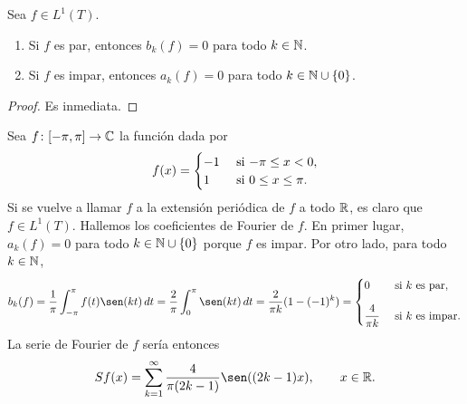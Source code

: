 \documentclass[a4paper, 11pt, oneside]{report}
\begin{document}
\begin{proposition}
  Sea $f \in L^1(T)$.
  \begin{enumerate}
    \item Si $f$ es par, entonces $b_k(f)= 0$ para todo $k \in \mathbb N$.
    \item Si $f$ es impar, entonces $a_k(f)=0$ para todo $k \in \mathbb N \cup \{0\}$.
  \end{enumerate}
\end{proposition}

\begin{proof}
  Es inmediata.
\end{proof}

\begin{example}
  Sea $f \colon [-\pi, \pi] \to \mathbb C$ la función dada por
  \[f(x) = \begin{cases}
    -1 & $ si $ -\pi \leq x < 0, \\
    1 & $ si $ 0 \leq x \leq \pi.
  \end{cases}\]
  Si se vuelve a llamar $f$ a la extensión periódica de $f$ a todo $\mathbb R$, es claro que $f \in L^1(T)$. Hallemos los coeficientes de Fourier de $f$. En primer lugar, $a_k(f)=0$ para todo $k \in \mathbb N \cup \{0\}$ porque $f$ es impar. Por otro lado, para todo $k \in \mathbb N$,
    \[
    \begin{aligned}[t]
      b_k(f)=\frac{1}{\pi}\int_{-\pi}^\pi f(t)\sen(kt) \, dt = \frac{2}{\pi}\int_{0}^\pi \sen(kt)\, dt = \frac{2}{\pi k}(1-(-1)^k) = \begin{cases}
        0 & $ si $ k $ es par$, \\[10pt]
        \displaystyle \frac{4}{\pi k} & $ si $ k $ es impar$.
      \end{cases}
    \end{aligned}
    \]
  La serie de Fourier de $f$ sería entonces
  \[Sf(x) = \sum_{k=1}^\infty \frac{4}{\pi(2k-1)}\sen((2k-1)x), \qquad x \in \R.\]


\end{example}
\end{document}
